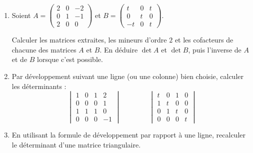 \begin{frame}
\begin{miniexercice}

\begin{enumerate}
  \item Soient $A=\begin{pmatrix}2&0&-2\\0&1&-1\\2&0&0\end{pmatrix}$
  et $B = \begin{pmatrix}t&0&t\\0&t&0\\-t&0&t\end{pmatrix}$.
  
  
  Calculer les matrices extraites, les mineurs d'ordre $2$ et les cofacteurs de chacune
  des matrices $A$ et $B$. En déduire $\det A$ et $\det B$, puis 
  l'inverse de $A$ et de $B$ lorsque c'est possible.
  
  \item Par développement suivant une ligne (ou une colonne) bien choisie, calculer les déterminants :
  $$\begin{vmatrix}1&0&1&2\\0&0&0&1\\1&1&1&0\\0&0&0&-1\end{vmatrix}
  \qquad\qquad
  \begin{vmatrix}t&0&1&0\\1&t&0&0\\0&1&t&0\\0&0&0&t\end{vmatrix}$$

  \item En utilisant la formule de développement par rapport à une ligne,
  recalculer le déterminant d'une matrice triangulaire.
\end{enumerate}
\end{miniexercice}
\end{frame}

